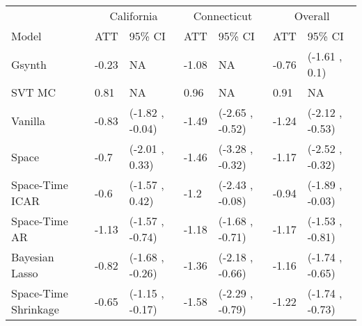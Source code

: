 \begin{table}
\centering
\begin{tabular}[t]{l|l|l|l|l|l|l}
\hline
\multicolumn{1}{c|}{ } & \multicolumn{2}{c|}{California} & \multicolumn{2}{c|}{Connecticut} & \multicolumn{2}{c}{Overall} \\
\cline{2-3} \cline{4-5} \cline{6-7}
Model & ATT & 95\% CI & ATT & 95\% CI & ATT & 95\% CI\\
\hline
Gsynth & -0.23 & NA & -1.08 & NA & -0.76 & (-1.61 , 0.1)\\
\hline
SVT MC & 0.81 & NA & 0.96 & NA & 0.91 & NA\\
\hline
Vanilla & -0.83 & (-1.82 , -0.04) & -1.49 & (-2.65 , -0.52) & -1.24 & (-2.12 , -0.53)\\
\hline
Space & -0.7 & (-2.01 , 0.33) & -1.46 & (-3.28 , -0.32) & -1.17 & (-2.52 , -0.32)\\
\hline
Space-Time 
 ICAR & -0.6 & (-1.57 , 0.42) & -1.2 & (-2.43 , -0.08) & -0.94 & (-1.89 , -0.03)\\
\hline
Space-Time 
 AR & -1.13 & (-1.57 , -0.74) & -1.18 & (-1.68 , -0.71) & -1.17 & (-1.53 , -0.81)\\
\hline
Bayesian 
 Lasso & -0.82 & (-1.68 , -0.26) & -1.36 & (-2.18 , -0.66) & -1.16 & (-1.74 , -0.65)\\
\hline
Space-Time 
 Shrinkage & -0.65 & (-1.15 , -0.17) & -1.58 & (-2.29 , -0.79) & -1.22 & (-1.74 , -0.73)\\
\hline
\end{tabular}
\end{table}
